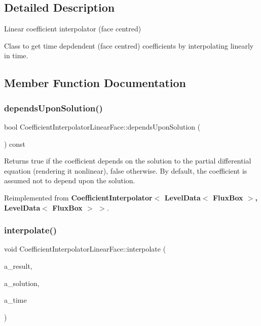 \subsection{Detailed Description}
Linear coefficient interpolator (face centred) 

Class to get time depdendent (face centred) coefficients by interpolating linearly in time. 

\subsection{Member Function Documentation}
\mbox{\label{class_coefficient_interpolator_linear_face_a5403028af5179675f232939044032a14}} 
\subsubsection{\texorpdfstring{depends\+Upon\+Solution()}{dependsUponSolution()}}
{\footnotesize\ttfamily bool Coefficient\+Interpolator\+Linear\+Face\+::depends\+Upon\+Solution (\begin{DoxyParamCaption}{ }\end{DoxyParamCaption}) const\hspace{0.3cm}{\ttfamily [virtual]}}

Returns true if the coefficient depends on the solution to the partial differential equation (rendering it nonlinear), false otherwise. By default, the coefficient is assumed not to depend upon the solution. 

Reimplemented from \textbf{ Coefficient\+Interpolator$<$ Level\+Data$<$ Flux\+Box $>$, Level\+Data$<$ Flux\+Box $>$ $>$}.

\mbox{\label{class_coefficient_interpolator_linear_face_a825a5def3f5da9e2a8890bd46d2af5b0}} 
\subsubsection{\texorpdfstring{interpolate()}{interpolate()}}
{\footnotesize\ttfamily void Coefficient\+Interpolator\+Linear\+Face\+::interpolate (\begin{DoxyParamCaption}\item[{\textbf{ Level\+Data}$<$ \textbf{ Flux\+Box} $>$ \&}]{a\+\_\+result,  }\item[{const \textbf{ Level\+Data}$<$ \textbf{ Flux\+Box} $>$ \&}]{a\+\_\+solution,  }\item[{\textbf{ Real}}]{a\+\_\+time }\end{DoxyParamCaption})\hspace{0.3cm}{\ttfamily [virtual]}}


